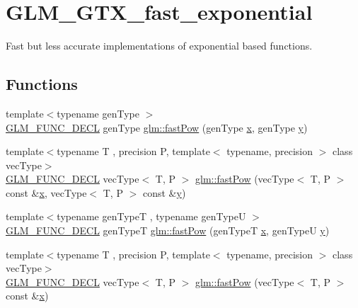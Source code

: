 \hypertarget{group__gtx__fast__exponential}{}\section{G\+L\+M\+\_\+\+G\+T\+X\+\_\+fast\+\_\+exponential}
\label{group__gtx__fast__exponential}


Fast but less accurate implementations of exponential based functions.  


\subsection*{Functions}
\begin{DoxyCompactItemize}
\item 
{\footnotesize template$<$typename gen\+Type $>$ }\\\mbox{\hyperlink{setup_8hpp_ab2d052de21a70539923e9bcbf6e83a51}{G\+L\+M\+\_\+\+F\+U\+N\+C\+\_\+\+D\+E\+CL}} gen\+Type \mbox{\hyperlink{group__gtx__fast__exponential_ga5340e98a11fcbbd936ba6e983a154d50}{glm\+::fast\+Pow}} (gen\+Type \mbox{\hyperlink{glad_8h_a92d0386e5c19fb81ea88c9f99644ab1d}{x}}, gen\+Type \mbox{\hyperlink{glad_8h_a66ddd433d2cacfe27f5906b7e86faeed}{y}})
\item 
{\footnotesize template$<$typename T , precision P, template$<$ typename, precision $>$ class vec\+Type$>$ }\\\mbox{\hyperlink{setup_8hpp_ab2d052de21a70539923e9bcbf6e83a51}{G\+L\+M\+\_\+\+F\+U\+N\+C\+\_\+\+D\+E\+CL}} vec\+Type$<$ T, P $>$ \mbox{\hyperlink{group__gtx__fast__exponential_ga07b73976a9af4005945bc338b45d8466}{glm\+::fast\+Pow}} (vec\+Type$<$ T, P $>$ const \&\mbox{\hyperlink{glad_8h_a92d0386e5c19fb81ea88c9f99644ab1d}{x}}, vec\+Type$<$ T, P $>$ const \&\mbox{\hyperlink{glad_8h_a66ddd433d2cacfe27f5906b7e86faeed}{y}})
\item 
{\footnotesize template$<$typename gen\+TypeT , typename gen\+TypeU $>$ }\\\mbox{\hyperlink{setup_8hpp_ab2d052de21a70539923e9bcbf6e83a51}{G\+L\+M\+\_\+\+F\+U\+N\+C\+\_\+\+D\+E\+CL}} gen\+TypeT \mbox{\hyperlink{group__gtx__fast__exponential_ga7f2562db9c3e02ae76169c36b086c3f6}{glm\+::fast\+Pow}} (gen\+TypeT \mbox{\hyperlink{glad_8h_a92d0386e5c19fb81ea88c9f99644ab1d}{x}}, gen\+TypeU \mbox{\hyperlink{glad_8h_a66ddd433d2cacfe27f5906b7e86faeed}{y}})
\item 
{\footnotesize template$<$typename T , precision P, template$<$ typename, precision $>$ class vec\+Type$>$ }\\\mbox{\hyperlink{setup_8hpp_ab2d052de21a70539923e9bcbf6e83a51}{G\+L\+M\+\_\+\+F\+U\+N\+C\+\_\+\+D\+E\+CL}} vec\+Type$<$ T, P $>$ \mbox{\hyperlink{group__gtx__fast__exponential_ga29924aea1aa11c5c504fb2d621221906}{glm\+::fast\+Pow}} (vec\+Type$<$ T, P $>$ const \&\mbox{\hyperlink{glad_8h_a92d0386e5c19fb81ea88c9f99644ab1d}{x}})

\end{DoxyCompactItemize}
